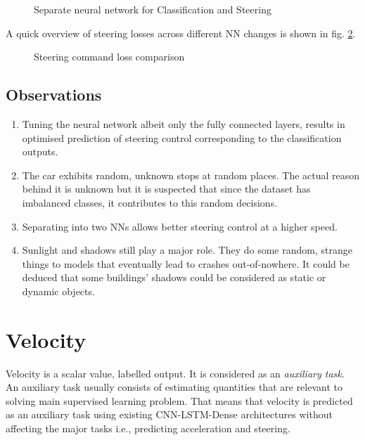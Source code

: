 \begin{figure}[!ht]
	\centering
    \def\svgwidth{\textwidth}
    \caption{Separate neural network for Classification and Steering}
    \label{fig:ds3categoricalcrossentropy2nn}
\end{figure}

A quick overview of steering losses across different NN changes is shown in fig. \ref{fig:ds3categoricalcrossentropysteeringcompare}.
 \begin{figure}[!ht]
	\centering
    \def\svgwidth{0.9\textwidth}
    \caption{Steering command loss comparison}
    \label{fig:ds3categoricalcrossentropysteeringcompare}
\end{figure}

\subsection{Observations}
\begin{enumerate}
    \item Tuning the neural network albeit only the fully connected layers, results in
        optimised prediction of steering control corresponding to the classification
        outputs.
    \item The car exhibits random, unknown stops at random places. The actual reason
        behind it is unknown but it is suspected that since the dataset has imbalanced
        classes, it contributes to this random decisions.
    \item Separating into two NNs allows better steering control at a higher speed.
    \item Sunlight and shadows still play a major role. They do some random, strange
        things to models that eventually lead to crashes out-of-nowhere. It could be
        deduced that some buildings' shadows could be considered as static or dynamic
        objects.
\end{enumerate}

\section{Velocity}
Velocity is a scalar value, labelled output. It is considered as an \textit{auxiliary
task}. An auxiliary task usually consists of estimating quantities that are relevant to
solving main supervised learning problem. That means that velocity is predicted as an
auxiliary task using existing CNN-LSTM-Dense architectures without affecting the major
tasks i.e., predicting acceleration and steering.

